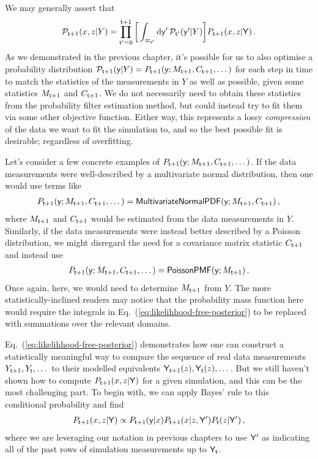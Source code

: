 We may generally assert that 
\begin{align}
{\cal P}_{{\sf t}+1}(x,z\vert Y)=\prod_{{\sf t}'=0}^{{\sf t}+1} \bigg[ \int_{\varpi_{{\sf t}'}} {\rm d}{\sf y}' \, {\cal P}_{{\sf t}'}({\sf y}'\vert Y) \bigg] P_{{\sf t}+1}(x,z \vert {\sf Y}) \label{eq:likelihhood-free-posterior} \,.
\end{align}
As we demonstrated in the previous chapter, it's possible for us to also optimise a probability distribution ${\cal P}_{{\sf t}+1}({\sf y}\vert Y) = P_{{\sf t}+1}({\sf y};M_{{\sf t}+1},C_{{\sf t}+1}, \dots)$ for each step in time to match the statistics of the measurements in $Y$ as well as possible, given some statistics $M_{{\sf t}+1}$ and $C_{{\sf t}+1}$. We do not necessarily need to obtain these statistics from the probability filter estimation method, but could instead try to fit them via some other objective function. Either way, this represents a lossy \emph{compression} of the data we want to fit the simulation to, and so the best possible fit is desirable; regardless of overfitting.

Let's consider a few concrete examples of $P_{{\sf t}+1}({\sf y};M_{{\sf t}+1},C_{{\sf t}+1}, \dots)$. If the data measurements were well-described by a multivariate normal distribution, then one would use terms like
\begin{align}
P_{{\sf t}+1}({\sf y};M_{{\sf t}+1},C_{{\sf t}+1}, \dots) = {\sf MultivariateNormalPDF}({\sf y};M_{{\sf t}+1},C_{{\sf t}+1})\,,
\end{align}
where $M_{{\sf t}+1}$ and $C_{{\sf t}+1}$ would be estimated from the data measurements in $Y$. Similarly, if the data measurements were instead better described by a Poisson distribution, we might disregard the need for a covariance matrix statistic $C_{{\sf t}+1}$ and instead use
\begin{align}
P_{{\sf t}+1}({\sf y};M_{{\sf t}+1},C_{{\sf t}+1}, \dots) = {\sf PoissonPMF}({\sf y};M_{{\sf t}+1})\,.
\end{align}
Once again, here, we would need to determine $M_{{\sf t}+1}$ from $Y$. The more statistically-inclined readers may notice that the probability mass function here would require the integrals in Eq.~(\ref{eq:likelihhood-free-posterior}) to be replaced with summations over the relevant domains.

Eq.~(\ref{eq:likelihhood-free-posterior}) demonstrates how one can construct a statistically meaningful way to compare the sequence of real data measurements $Y_{{\sf t}+1}, Y_{{\sf t}}, \dots$ to their modelled equivalents ${\sf Y}_{{\sf t}+1}(z), {\sf Y}_{{\sf t}}(z), \dots$. But we still haven't shown how to compute $P_{{\sf t}+1}(x,z\vert {\sf Y})$ for a given simulation, and this can be the most challenging part. To begin with, we can apply Bayes' rule to this conditional probability and find 
\begin{align}
P_{{\sf t}+1}(x,z\vert {\sf Y}) \propto P_{{\sf t}+1}({\sf y}\vert x)P_{{\sf t}+1}(x\vert z, {\sf Y}')P_{{\sf t}}(z\vert {\sf Y}') \,,
\end{align}
where we are leveraging our notation in previous chapters to use ${\sf Y}'$ as indicating all of the past rows of simulation measurements up to ${\sf Y}_{{\sf t}}$.

